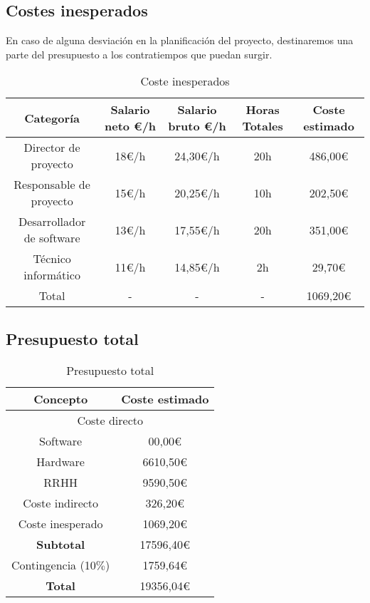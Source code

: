 \documentclass[titlepage,10.5pt]{report}
\begin{document}
\subsection{Costes inesperados}

En caso de alguna desviación en la planificación del proyecto, destinaremos una parte del presupuesto a los contratiempos que puedan surgir.

\begin{table}[H]
	\centering
	\begin{tabular}{|c|c|c|c|c|}
		\hline
		\textbf{Categoría} & \textbf{Salario neto €/h} & \textbf{Salario bruto €/h} & \textbf{Horas Totales} & \textbf{Coste estimado} \\ \hline \hline
		Director de proyecto 	  & 18€/h & 24,30€/h & 20h  &  486,00€  \\ \hline
		Responsable de proyecto   & 15€/h & 20,25€/h & 10h  &  202,50€  \\ \hline
		Desarrollador de software & 13€/h & 17,55€/h & 20h  &  351,00€  \\ \hline
		Técnico informático 	  & 11€/h & 14,85€/h &  2h  &   29,70€  \\ \hline \hline			
		Total 					  & - 	  & - 		 & -    & 1069,20€  \\ \hline
	\end{tabular}
	\caption{Coste inesperados}
	\label{rrhh_2}
\end{table}

\subsection{Presupuesto total}

\begin{table}[H]
	\centering
	\begin{tabular}{|c|c|}
		\hline
		\textbf{Concepto} 		& \textbf{Coste estimado} \\ \hline \hline
		\multicolumn{2}{|c|}{Coste directo}  \\ \hline
		Software 				&    00,00€  \\
		Hardware				&  6610,50€  \\ 
		RRHH 					&  9590,50€  \\ \hline 
		Coste indirecto			&   326,20€  \\ \hline
		Coste inesperado		&  1069,20€	 \\ \hline		
		\textbf{Subtotal}		& 17596,40€  \\ \hline
		Contingencia (10$\%$) 	&  1759,64€  \\ \hline \hline
		\textbf{Total}			& 19356,04€  \\ \hline
	\end{tabular}
	\caption{Presupuesto total}
	\label{total}
\end{table}
\end{document}
